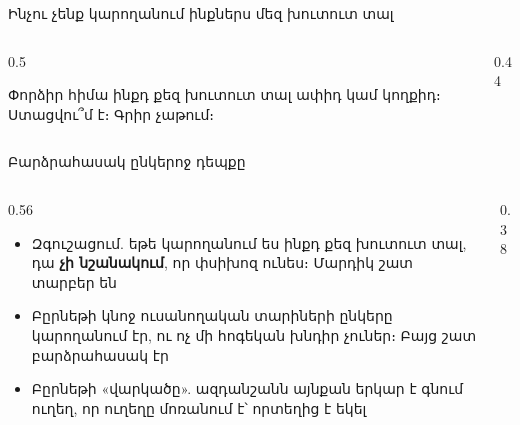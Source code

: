 \begin{frame}{Ինչու չենք կարողանում ինքներս մեզ խուտուտ տալ}
  \begin{columns}[c]
    \begin{column}{0.5\textwidth}
      \begin{tryit}
        Փորձիր հիմա ինքդ քեզ խուտուտ տալ ափիդ կամ կողքիդ։ Ստացվու՞մ է։ Գրիր չաթում։
      \end{tryit}
    \end{column}
    \begin{column}{0.44\textwidth}
    \end{column}
  \end{columns}
\end{frame}

\begin{frame}{Բարձրահասակ ընկերոջ դեպքը}
  \begin{columns}[c]
    \begin{column}{0.56\textwidth}
      \begin{itemize}
        \item Զգուշացում. եթե կարողանում ես ինքդ քեզ խուտուտ տալ, դա \textbf{չի նշանակում}, որ փսիխոզ ունես։ Մարդիկ շատ տարբեր են
        \item<2-> Բըրնեթի կնոջ ուսանողական տարիների ընկերը կարողանում էր, ու ոչ մի հոգեկան խնդիր չուներ։ Բայց շատ բարձրահասակ էր
        \item<3-> Բըրնեթի «վարկածը». ազդանշանն այնքան երկար է գնում ուղեղ, որ ուղեղը մոռանում է՝ որտեղից է եկել
      \end{itemize}
    \end{column}
    \begin{column}{0.38\textwidth}
    \end{column}
  \end{columns}
\end{frame}

